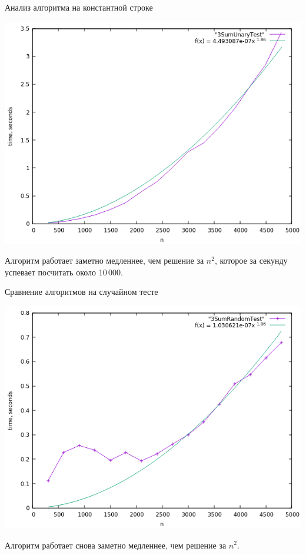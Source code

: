 \documentclass[hyperref=unicode,graphics=pdflatex,12pt]{beamer}
\begin{document}
\begin{frame}{Анализ алгоритма на константной строке}
\begin{center}
\includegraphics[scale=0.5]{pics/4.png}
\end{center}

Алгоритм работает заметно медленнее, чем решение за $n^2$, которое за секунду успевает посчитать около 10\,000.

\end{frame}

\begin{frame}{Сравнение алгоритмов на случайном тесте}
\begin{center}
\includegraphics[scale=0.5]{pics/5.png}
\end{center}

Алгоритм работает снова заметно медленнее, чем решение за $n^2$.
\end{frame}
\end{document}
